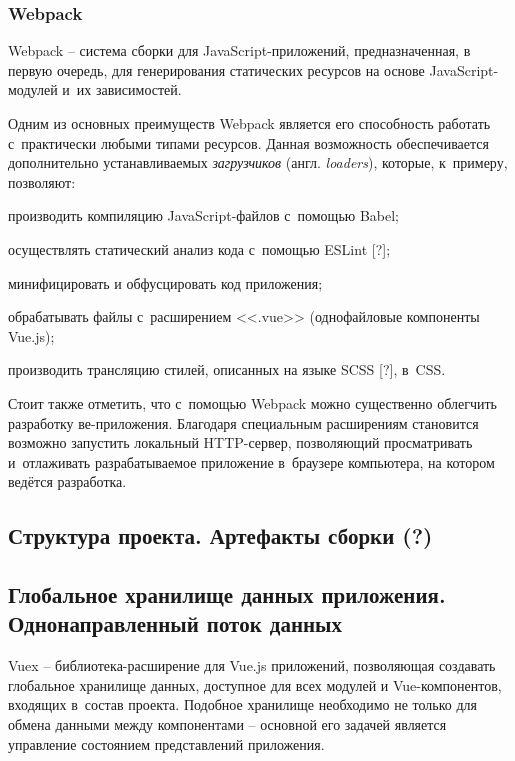 

\subsubsection{Webpack}

Webpack -- система сборки для JavaScript-приложений, предназначенная, в первую очередь, для генерирования статических ресурсов на основе JavaScript-модулей и~их зависимостей.

Одним из основных преимуществ Webpack является его способность работать с~практически любыми типами ресурсов. Данная возможность обеспечивается дополнительно устанавливаемых \emph{загрузчиков} (англ. \emph{loaders}), которые, к~примеру, позволяют:
\begin{dashitemize}
  \item производить компиляцию JavaScript-файлов с~помощью Babel;
  \item осуществлять статический анализ кода с~помощью ESLint [?];
  \item минифицировать и обфусцировать код приложения;
  \item обрабатывать файлы с~расширением <<.vue>> (однофайловые компоненты Vue.js);
  \item производить трансляцию стилей, описанных на языке SCSS [?], в~CSS.
\end{dashitemize}

Стоит также отметить, что с~помощью Webpack можно существенно облегчить разработку ве-приложения. Благодаря специальным расширениям становится возможно запустить локальный HTTP-сервер, позволяющий просматривать и~отлаживать разрабатываемое приложение в~браузере компьютера, на котором ведётся разработка.



\subsection{Структура проекта. Артефакты сборки (?)}



\subsection{Глобальное хранилище данных приложения. Однонаправленный поток данных}

Vuex -- библиотека-расширение для Vue.js приложений, позволяющая создавать глобальное хранилище данных, доступное для всех модулей и Vue-компонентов, входящих в~состав проекта. Подобное хранилище необходимо не только для обмена данными между компонентами -- основной его задачей является управление состоянием представлений приложения.

